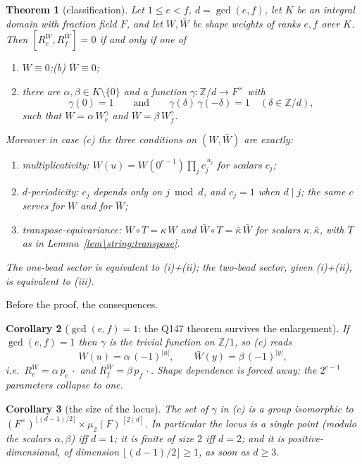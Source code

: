 \documentclass[11pt]{article}
\newtheorem{theorem}{Theorem}[section]
\newtheorem{corollary}[theorem]{Corollary}
\theoremstyle{definition}
\theoremstyle{remark}
\newcommand{\Z}{\mathbb{Z}}
\newcommand{\Mult}[1]{#1\,\cdot}
\begin{document}
\begin{theorem}[classification]\label{thm:main}
Let $1\le e<f$, $d=\gcd(e,f)$, let $K$ be an integral domain with fraction field $F$,
and let $W,\bar W$ be shape weights of ranks $e,f$ over $K$.  Then
$[R_e^{W},R_f^{\bar W}]=0$ if and only if one of
\begin{enumerate}
\item[(a)] $W\equiv0$;\qquad (b) $\bar W\equiv0$;
\item[(c)] there are $\alpha,\beta\in K\setminus\{0\}$ and a function
  $\gamma:\Z/d\to F^{\times}$ with
  \[
     \gamma(0)=1 \qquad\text{and}\qquad \gamma(\delta)\,\gamma(-\delta)=1
     \quad(\delta\in\Z/d),
  \]
  such that $W=\alpha\,W^{\gamma}_e$ and $\bar W=\beta\,W^{\gamma}_f$.
\end{enumerate}
Moreover in case (c) the three conditions on $(W,\bar W)$ are exactly:
\begin{enumerate}
\item[(i)] \emph{multiplicativity}: $W(u)=W(0^{e-1})\prod_j c_j^{\,u_j}$ for scalars $c_j$;
\item[(ii)] \emph{$d$-periodicity}: $c_j$ depends only on $j\bmod d$, and $c_j=1$ when
   $d\mid j$; the same $c$ serves for $W$ and for $\bar W$;
\item[(iii)] \emph{transpose-equivariance}: $W\circ T=\kappa\,W$ and
  $\bar W\circ T=\bar\kappa\,\bar W$ for scalars $\kappa,\bar\kappa$, with $T$ as in
  Lemma~\ref{lem\string:transpose}.
\end{enumerate}
The one-bead sector is equivalent to (i)+(ii); the two-bead sector, given (i)+(ii), is
equivalent to (iii).
\end{theorem}

Before the proof, the consequences.

\begin{corollary}[$\gcd(e,f)=1$: the Q147 theorem survives the enlargement]\label{cor:coprime}
If $\gcd(e,f)=1$ then $\gamma$ is the trivial function on $\Z/1$, so (c) reads
\[
   W(u)=\alpha\,(-1)^{|u|},\qquad \bar W(y)=\beta\,(-1)^{|y|},
\]
i.e.\ $R_e^{W}=\alpha\,\Mult{p_e}$ and $R_f^{\bar W}=\beta\,\Mult{p_f}$.  Shape
dependence is \emph{forced away}: the $2^{e-1}$ parameters collapse to one.
\end{corollary}

\begin{corollary}[the size of the locus]\label{cor:size}
The set of $\gamma$ in (c) is a group isomorphic to
$(F^{\times})^{\lfloor (d-1)/2\rfloor}\times\mu_2(F)^{\,[2\mid d]}$.  In particular the
locus is a single point (modulo the scalars $\alpha,\beta$) iff $d=1$; it is finite of
size $2$ iff $d=2$; and it is positive-dimensional, of dimension
$\lfloor(d-1)/2\rfloor\ge1$, as soon as $d\ge3$.
\end{corollary}
\end{document}
